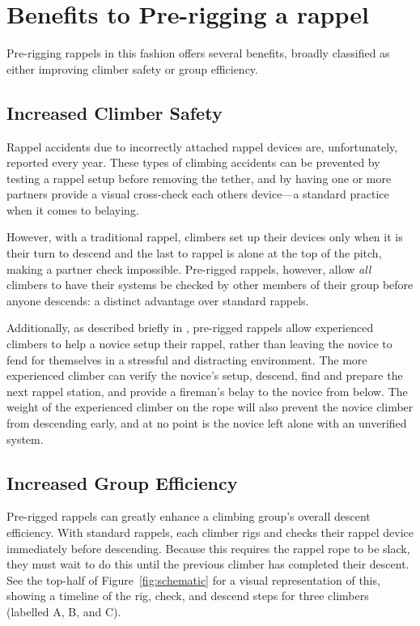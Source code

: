 \documentclass[nonacm,acmtog]{acmart}
\begin{document}
\section{Benefits to Pre-rigging a rappel}
\label{sec:benefits}

  Pre-rigging rappels in this fashion offers several benefits, broadly
  classified as either improving climber safety or group efficiency.

\subsection{Increased Climber Safety}

  Rappel accidents due to incorrectly attached rappel devices are,
  unfortunately, reported every year.  These types of climbing accidents can be
  prevented by testing a rappel setup before removing the tether, and by having
  one or more partners provide a visual cross-check each others device---a
  standard practice when it comes to belaying.
  
  However, with a traditional rappel, climbers set up their devices only when
  it is their turn to descend and the last to rappel is alone at the top of the
  pitch, making a partner check impossible.  Pre-rigged rappels, however, allow
  {\em all} climbers to have their systems be checked by other members of their
  group before anyone descends: a distinct advantage over standard rappels. 

  Additionally, as described briefly in , pre-rigged rappels
  allow experienced climbers to help a novice setup their rappel, rather than
  leaving the novice to fend for themselves in a stressful and distracting
  environment.  The more experienced climber can verify the novice's setup,
  descend, find and prepare the next rappel station, and provide a fireman's
  belay to the novice from below.  The weight of the experienced climber on the
  rope will also prevent the novice climber from descending early, and at no
  point is the novice left alone with an unverified system.

\subsection{Increased Group Efficiency}

  Pre-rigged rappels can greatly enhance a climbing group's overall descent
  efficiency.  With standard rappels, each climber rigs and checks their rappel
  device immediately before descending.  Because this requires the rappel rope
  to be slack, they must wait to do this until the previous climber has
  completed their descent.  See the top-half of Figure~\ref{fig:schematic} for
  a visual representation of this, showing a timeline of the rig, check, and
  descend steps for three climbers (labelled A, B, and C).
  
\end{document}
